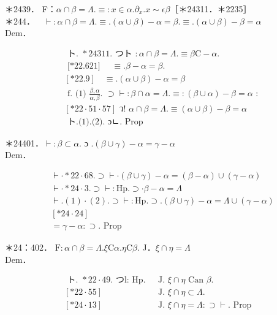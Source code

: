 \documentclass[10pt]{article}
\begin{document}
＊2439． F：$\alpha \cap \beta=\Lambda . \equiv: x \in \alpha . \partial_{x} . x \sim \epsilon \beta$［＊24311．＊2235］\\
＊244．$\quad \vdash: \alpha \cap \beta=\Lambda . \equiv .(\alpha \cup \beta)-\alpha=\beta . \equiv .(\alpha \cup \beta)-\beta=\alpha$\\
Dem．


\begin{align*}
& \text { ト. } * 24311 . \text { つト }: \alpha \cap \beta=\Lambda . \equiv \beta \mathrm{C}-\alpha . \\
& \text { [*22.621] } \quad \equiv . \beta-\alpha=\beta \text {. } \\
& {[* 22.9] \quad \equiv .(\alpha \cup \beta)-\alpha=\beta}  \tag{1}\\
& \text { f. (1) } \frac{\beta, \alpha}{\alpha, \beta} \text {. } \supset \vdash: \beta \cap \alpha=\Lambda . \equiv:(\beta \cup \alpha)-\beta=\alpha \text { : } \\
& {[* 22 \cdot 51 \cdot 57] \text { ว! } \alpha \cap \beta=\Lambda . \equiv(\alpha \cup \beta)-\beta=\alpha}  \tag{2}\\
& \text { ト.(1).(2). ɔㄴ. Prop }
\end{align*}


＊24401．$\vdash: \beta \subset \alpha$. ɔ $.(\beta \cup \gamma)-\alpha=\gamma-\alpha$\\
Dem．


\begin{align*}
& \vdash \cdot * 22 \cdot 68 . \supset \vdash \cdot(\beta \cup \gamma)-\alpha=(\beta-\alpha) \cup(\gamma-\alpha)  \tag{1}\\
& \vdash \cdot * 24 \cdot 3 . \supset \vdash: \mathrm{Hp} . \supset \cdot \beta-\alpha=\Lambda  \tag{2}\\
& \vdash .(1) \cdot(2) . \supset \vdash: \mathrm{Hp} . \supset .(\beta \cup \gamma)-\alpha=\Lambda \cup(\gamma-\alpha) \\
& {[* 24 \cdot 24]} \\
& =\gamma-\alpha: \supset \text {. Prop }
\end{align*}


＊24：402． $\mathrm{F}: \alpha \cap \beta=\Lambda . \xi \mathrm{C} \alpha . \eta \mathrm{C} \beta$. J．$\xi \cap \eta=\Lambda$\\
Dem．

$$
\begin{array}{ll}
\text { ト. } * 22 \cdot 49 . \text { つl: Hp. } & \text { J. } \xi \cap \eta \text { Can } \beta . \\
{[* 22 \cdot 55]} & \text { J. } \xi \cap \eta \subset \Lambda . \\
{[* 24 \cdot 13]} & \text { J. } \xi \cap \eta=\Lambda: \supset \vdash . \text { Prop }
\end{array}
$$
\end{document}
